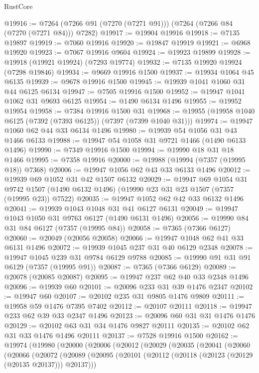 \begin{lexlean}{RustCore}
\begin{coremodule}
@19916 := @7264 (@7266 @91 (@7270 (@7271 @91))) (@7264 (@7266 @84 (@7270 (@7271 @84))) @7282)
@19917 := @19904 @19916
@19918 := @7135 @19897
@19919 := @7060 @19916
@19920 := @19847 @19919
@19921 := @6968 @19920
@19923 := @7067 @19916 @9604
@19924 := @19923 @19899
@19928 := @19918 (@19921 @19924) (@7293 @19774)
@19932 := @7135 @19920 @19924 (@7298 @19846)
@19934 := @9669 @19916 @1500
@19937 := @19934 @1064 @45 @6135
@19939 := @9678 @19916 @1500
@19945 := @19939 @1041 @1060 @31 @44 @6125 @6134
@19947 := @7505 @19916 @1500
@19952 := @19947 @1041 @1062 @31 @9693 @6125
@19954 := @1490 @6134 @1496
@19955 := @19952 @19954
@19958 := @7384 @19916 @1500 @31
@19968 := @19955 (@19958 @1040 @6125 (@7392 (@7393 @6125)) (@7397 (@7399 @1040 @31)))
@19974 := @19947 @1060 @62 @44 @33 @6134 @1496
@19980 := @19939 @54 @1056 @31 @43 @1466 @6133
@19988 := @19947 @54 @1058 @31 @9721 @1466 (@1490 @6133 @1496)
@19990 := @7349 @19916 @1500
@19994 := @19990 @18 @31 @18 @1466
@19995 := @7358 @19916
@20000 := @19988 (@19994 (@7357 (@19995 @18)) @7368)
@20006 := @19947 @1056 @62 @43 @33 @6133 @1496
@20012 := @19939 @69 @1052 @31 @42 @1507 @6132
@20029 := @19947
    @69
    @1054
    @31
    @9742
    @1507
    (@1490 @6132 @1496)
    (@19990 @23 @31 @23 @1507 (@7357 (@19995 @23)) @7522)
@20035 := @19947 @1052 @62 @42 @33 @6132 @1496
@20041 := @19939 @1043 @1048 @31 @41 @6127 @6131
@20049 := @19947 @1043 @1050 @31 @9763 @6127 (@1490 @6131 @1496)
@20056 := @19990 @84 @31 @84 @6127 (@7357 (@19995 @84))
@20058 := @7365 (@7366 @6127)
@20060 := @20049 (@20056 @20058)
@20066 := @19947 @1048 @62 @41 @33 @6131 @1496
@20072 := @19939 @1045 @237 @31 @40 @6129 @2348
@20078 := @19947 @1045 @239 @31 @9784 @6129 @9788
@20085 := @19990 @91 @31 @91 @6129 (@7357 (@19995 @91))
@20087 := @7365 (@7366 @6129)
@20089 := @20078 (@20085 @20087)
@20095 := @19947 @237 @62 @40 @33 @2348 @1496
@20096 := @19939 @60
@20101 := @20096 @233 @31 @39 @1476 @2347
@20102 := @19947 @60
@20107 := @20102 @235 @31 @9805 @1476 @9809
@20111 := @19958 @59 @1476 @7395 @7402
@20112 := @20107 @20111
@20118 := @19947 @233 @62 @39 @33 @2347 @1496
@20123 := @20096 @60 @31 @31 @1476 @1476
@20129 := @20102 @63 @31 @34 @1476 @9827 @20111
@20135 := @20102 @62 @31 @33 @1476 @1496 @20111
@20137 := @7528 @19916 @1500
@20162 := @19974
    (@19980
      (@20000
        (@20006
          (@20012
            (@20029
              (@20035
                (@20041
                  (@20060
                    (@20066
                      (@20072
                        (@20089
                          (@20095
                            (@20101 (@20112 (@20118 (@20123 (@20129 (@20135 @20137))) @20137)))

\end{coremodule}
\end{lexlean}
